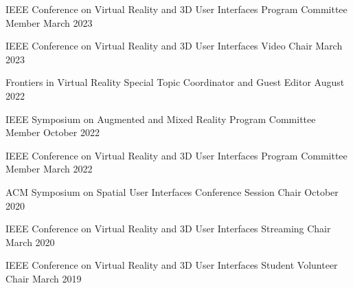 
\begin{cventries}
  
  \cventry
    {IEEE Conference on Virtual Reality and 3D User Interfaces} %
    {Program Committee Member} %
    {March 2023} %
    {} %
    {}
    \vspace{-0.15in}
  
  \cventry
    {IEEE Conference on Virtual Reality and 3D User Interfaces} %
    {Video Chair} %
    {March 2023} %
    {} %
    {}
    \vspace{-0.15in}

  \cventry
    {Frontiers in Virtual Reality} %
    {Special Topic Coordinator and Guest Editor} %
    {August 2022} %
    {} %
    {}
    \vspace{-0.15in}

  \cventry
    {IEEE Symposium on Augmented and Mixed Reality} %
    {Program Committee Member} %
    {October 2022} %
    {} %
    {}
    \vspace{-0.15in}
  
  \cventry
    {IEEE Conference on Virtual Reality and 3D User Interfaces} %
    {Program Committee Member} %
    {March 2022} %
    {} %
    {}
    \vspace{-0.15in}
    
  \cventry
    {ACM Symposium on Spatial User Interfaces} %
    {Conference Session Chair} %
    {October 2020} %
    {} %
    {}
    \vspace{-0.15in}

  \cventry
    {IEEE Conference on Virtual Reality and 3D User Interfaces} %
    {Streaming Chair} %
    {March 2020} %
    {} %
    {}
    \vspace{-0.15in}

  \cventry
    {IEEE Conference on Virtual Reality and 3D User Interfaces} %
    {Student Volunteer Chair} %
    {March 2019} %
    {} %
    {}
    \vspace{-0.15in}
    

\end{cventries}
